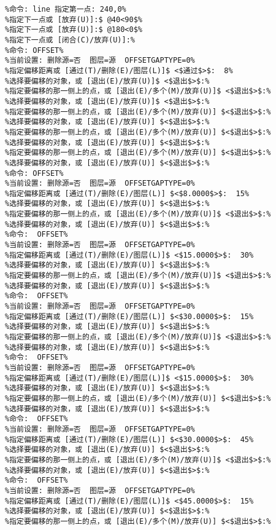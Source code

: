 \begin{lstlisting}
%命令: line 指定第一点: 240,0%
%指定下一点或 [放弃(U)]:$ @40<90$%
%指定下一点或 [放弃(U)]:$ @180<0$%
%指定下一点或 [闭合(C)/放弃(U)]:%
%命令: OFFSET%
%当前设置: 删除源=否  图层=源  OFFSETGAPTYPE=0%
%指定偏移距离或 [通过(T)/删除(E)/图层(L)]$ <$通过$>$:  8%
%选择要偏移的对象，或 [退出(E)/放弃(U)]$ <$退出$>$:%
%指定要偏移的那一侧上的点，或 [退出(E)/多个(M)/放弃(U)]$ <$退出$>$:%
%选择要偏移的对象，或 [退出(E)/放弃(U)]$ <$退出$>$:%
%指定要偏移的那一侧上的点，或 [退出(E)/多个(M)/放弃(U)] $<$退出$>$:%
%选择要偏移的对象，或 [退出(E)/放弃(U)] $<$退出$>$:%
%指定要偏移的那一侧上的点，或 [退出(E)/多个(M)/放弃(U)] $<$退出$>$:%
%选择要偏移的对象，或 [退出(E)/放弃(U)] $<$退出$>$:%
%指定要偏移的那一侧上的点，或 [退出(E)/多个(M)/放弃(U)] $<$退出$>$:%
%选择要偏移的对象，或 [退出(E)/放弃(U)] $<$退出$>$:%
%命令: OFFSET%
%当前设置: 删除源=否  图层=源  OFFSETGAPTYPE=0%
%指定偏移距离或 [通过(T)/删除(E)/图层(L)] $<$8.0000$>$:  15%
%选择要偏移的对象，或 [退出(E)/放弃(U)] $<$退出$>$:%
%指定要偏移的那一侧上的点，或 [退出(E)/多个(M)/放弃(U)]$ <$退出$>$:%
%选择要偏移的对象，或 [退出(E)/放弃(U)] $<$退出$>$:%
%命令:  OFFSET%
%当前设置: 删除源=否  图层=源  OFFSETGAPTYPE=0%
%指定偏移距离或 [通过(T)/删除(E)/图层(L)]$ <$15.0000$>$:  30%
%选择要偏移的对象，或 [退出(E)/放弃(U)] $<$退出$>$:%
%指定要偏移的那一侧上的点，或 [退出(E)/多个(M)/放弃(U)]$ <$退出$>$:%
%选择要偏移的对象，或 [退出(E)/放弃(U)] $<$退出$>$:%
%命令:  OFFSET%
%当前设置: 删除源=否  图层=源  OFFSETGAPTYPE=0%
%指定偏移距离或 [通过(T)/删除(E)/图层(L)] $<$30.0000$>$:  15%
%选择要偏移的对象，或 [退出(E)/放弃(U)] $<$退出$>$:%
%指定要偏移的那一侧上的点，或 [退出(E)/多个(M)/放弃(U)]$ <$退出$>$:%
%选择要偏移的对象，或 [退出(E)/放弃(U)] $<$退出$>$:%
%命令:  OFFSET%
%当前设置: 删除源=否  图层=源  OFFSETGAPTYPE=0%
%指定偏移距离或 [通过(T)/删除(E)/图层(L)]$ <$15.0000$>$:  30%
%选择要偏移的对象，或 [退出(E)/放弃(U)] $<$退出$>$:%
%指定要偏移的那一侧上的点，或 [退出(E)/多个(M)/放弃(U)] $<$退出$>$:%
%选择要偏移的对象，或 [退出(E)/放弃(U)] $<$退出$>$:%
%命令:  OFFSET%
%当前设置: 删除源=否  图层=源  OFFSETGAPTYPE=0%
%指定偏移距离或 [通过(T)/删除(E)/图层(L)] $<$30.0000$>$:  45%
%选择要偏移的对象，或 [退出(E)/放弃(U)] $<$退出$>$:%
%指定要偏移的那一侧上的点，或 [退出(E)/多个(M)/放弃(U)]$ <$退出$>$:%
%选择要偏移的对象，或 [退出(E)/放弃(U)] $<$退出$>$:%
%命令:  OFFSET%
%当前设置: 删除源=否  图层=源  OFFSETGAPTYPE=0%
%指定偏移距离或 [通过(T)/删除(E)/图层(L)]$ <$45.0000$>$:  15%
%选择要偏移的对象，或 [退出(E)/放弃(U)] $<$退出$>$:%
%指定要偏移的那一侧上的点，或 [退出(E)/多个(M)/放弃(U)] $<$退出$>$:%

\end{lstlisting}
